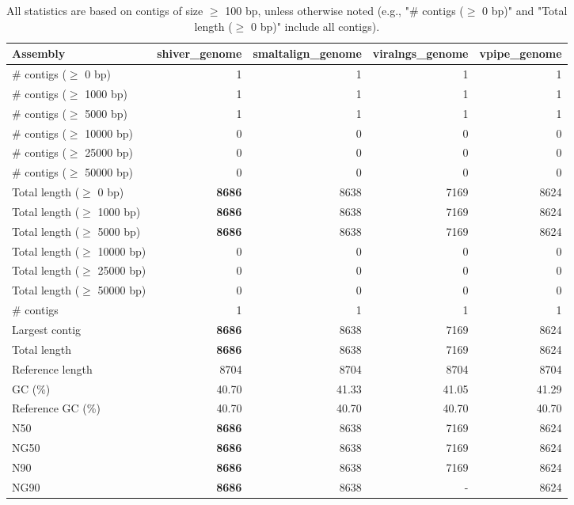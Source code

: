 \documentclass[12pt,a4paper]{article}
\begin{document}
\begin{table}[ht]
\begin{center}
\caption{All statistics are based on contigs of size $\geq$ 100 bp, unless otherwise noted (e.g., "\# contigs ($\geq$ 0 bp)" and "Total length ($\geq$ 0 bp)" include all contigs).}
\begin{tabular}{|l*{4}{|r}|}
\hline
Assembly & shiver\_genome & smaltalign\_genome & viralngs\_genome & vpipe\_genome \\ \hline
\# contigs ($\geq$ 0 bp) & 1 & 1 & 1 & 1 \\ \hline
\# contigs ($\geq$ 1000 bp) & 1 & 1 & 1 & 1 \\ \hline
\# contigs ($\geq$ 5000 bp) & 1 & 1 & 1 & 1 \\ \hline
\# contigs ($\geq$ 10000 bp) & 0 & 0 & 0 & 0 \\ \hline
\# contigs ($\geq$ 25000 bp) & 0 & 0 & 0 & 0 \\ \hline
\# contigs ($\geq$ 50000 bp) & 0 & 0 & 0 & 0 \\ \hline
Total length ($\geq$ 0 bp) & {\bf 8686} & 8638 & 7169 & 8624 \\ \hline
Total length ($\geq$ 1000 bp) & {\bf 8686} & 8638 & 7169 & 8624 \\ \hline
Total length ($\geq$ 5000 bp) & {\bf 8686} & 8638 & 7169 & 8624 \\ \hline
Total length ($\geq$ 10000 bp) & 0 & 0 & 0 & 0 \\ \hline
Total length ($\geq$ 25000 bp) & 0 & 0 & 0 & 0 \\ \hline
Total length ($\geq$ 50000 bp) & 0 & 0 & 0 & 0 \\ \hline
\# contigs & 1 & 1 & 1 & 1 \\ \hline
Largest contig & {\bf 8686} & 8638 & 7169 & 8624 \\ \hline
Total length & {\bf 8686} & 8638 & 7169 & 8624 \\ \hline
Reference length & 8704 & 8704 & 8704 & 8704 \\ \hline
GC (\%) & 40.70 & 41.33 & 41.05 & 41.29 \\ \hline
Reference GC (\%) & 40.70 & 40.70 & 40.70 & 40.70 \\ \hline
N50 & {\bf 8686} & 8638 & 7169 & 8624 \\ \hline
NG50 & {\bf 8686} & 8638 & 7169 & 8624 \\ \hline
N90 & {\bf 8686} & 8638 & 7169 & 8624 \\ \hline
NG90 & {\bf 8686} & 8638 & - & 8624 \\ \hline

\end{tabular}
\end{center}
\end{table}
\end{document}

